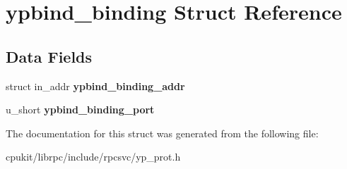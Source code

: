 \hypertarget{structypbind__binding}{}\section{ypbind\+\_\+binding Struct Reference}
\label{structypbind__binding}
\subsection*{Data Fields}
\begin{DoxyCompactItemize}
\item 
\mbox{\label{structypbind__binding_a02f6504f64cebab70d687e3bc03021df}} 
struct in\+\_\+addr {\bfseries ypbind\+\_\+binding\+\_\+addr}
\item 
\mbox{\label{structypbind__binding_a9538d24313de9b4abea145ed13b57f79}} 
u\+\_\+short {\bfseries ypbind\+\_\+binding\+\_\+port}
\end{DoxyCompactItemize}


The documentation for this struct was generated from the following file\+:\begin{DoxyCompactItemize}
\item 
cpukit/librpc/include/rpcsvc/yp\+\_\+prot.\+h\end{DoxyCompactItemize}
